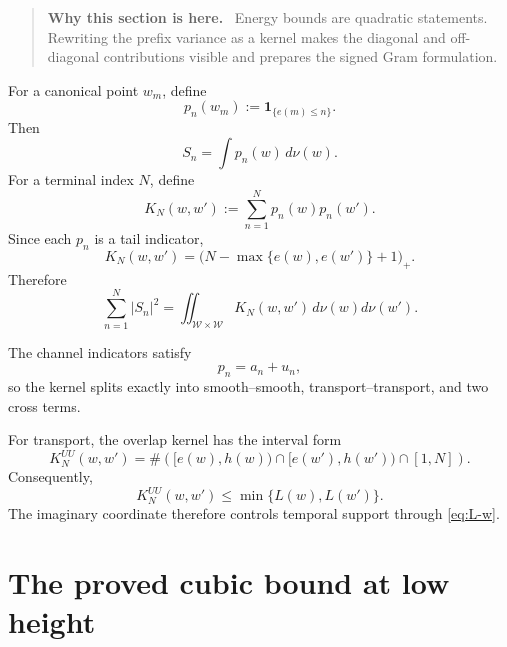 \documentclass[11pt]{article}
\theoremstyle{definition}
\theoremstyle{remark}
\newcommand{\1}{\mathbf{1}}
\newenvironment{motivation}
  {\begin{quote}\small\color{ovvogray}\textbf{Why this section is here.}\ }
  {\end{quote}}
\begin{document}
\begin{motivation}
Energy bounds are quadratic statements.  Rewriting the prefix variance as a kernel makes the diagonal and off-diagonal contributions visible and prepares the signed Gram formulation.
\end{motivation}

For a canonical point $w_m$, define
\begin{equation}
 p_n(w_m):=\1_{\{e(m)\le n\}}.
 \label{eq:prefix-indicator}
\end{equation}
Then
\begin{equation}
 S_n=\int p_n(w)\,d\nu(w).
 \label{eq:S-integral}
\end{equation}
For a terminal index $N$, define
\begin{equation}
 K_N(w,w')
 :=\sum_{n=1}^{N}p_n(w)p_n(w').
 \label{eq:prefix-kernel}
\end{equation}
Since each $p_n$ is a tail indicator,
\begin{equation}
 K_N(w,w')
 =
 \bigl(N-\max\{e(w),e(w')\}+1\bigr)_+.
 \label{eq:prefix-kernel-explicit}
\end{equation}
Therefore
\begin{equation}
 \boxed{
 \sum_{n=1}^{N}|S_n|^2
 =
 \iint_{\mathscr W\times\mathscr W}
 K_N(w,w')\,d\nu(w)d\nu(w').
 }
 \label{eq:variance-kernel}
\end{equation}

The channel indicators satisfy
\begin{equation}
 p_n=a_n+u_n,
 \label{eq:channel-indicator-sum}
\end{equation}
so the kernel splits exactly into smooth--smooth, transport--transport, and two cross terms.

For transport, the overlap kernel has the interval form
\begin{equation}
 K_N^{UU}(w,w')
 =
 \#\left(
 [e(w),h(w))
 \cap
 [e(w'),h(w'))
 \cap
 [1,N]
 \right).
 \label{eq:transport-overlap}
\end{equation}
Consequently,
\begin{equation}
 K_N^{UU}(w,w')
 \le\min\{L(w),L(w')\}.
 \label{eq:transport-overlap-bound}
\end{equation}
The imaginary coordinate therefore controls temporal support through \cref{eq:L-w}.

\section{The proved cubic bound at low height}
\label{sec:low-cubic}
\end{document}
